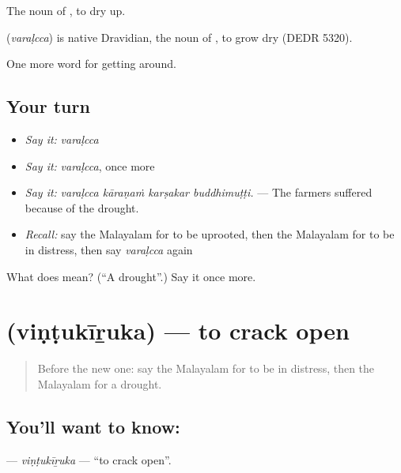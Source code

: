 The noun of , to dry up.

\begin{cousinweb}
\textbf{} (\emph{varaḷcca}) is native Dravidian, the noun of , to grow dry (DEDR 5320).
\end{cousinweb}

\begin{grammarlens}[title={What you've built}]
One more word for getting around.
\end{grammarlens}

\subsection*{Your turn}
\begin{itemize}
\raggedright
  \item \emph{Say it:} \emph{varaḷcca}
  \item \emph{Say it:} \emph{varaḷcca}, once more
  \item \emph{Say it:} \emph{varaḷcca kāraṇaṁ karṣakar buddhimuṭṭi.} — The farmers suffered because of the drought.
  \item \emph{Recall:} say the Malayalam for to be uprooted, then the Malayalam for to be in distress, then say \emph{varaḷcca} again
\end{itemize}

\begin{tcolorbox}[breakable,colback=teal!4,colframe=teal!35!black,title={Before you move on}]
What does  mean? (\textquotedblleft{}A drought\textquotedblright{}.) Say it once more.
\end{tcolorbox}
\section[\texorpdfstring{\ml{വിണ്ടുകീറുക} (viṇṭukīṟuka)}{വിണ്ടുകീറുക (viṇṭukīṟuka)}]{ (viṇṭukīṟuka) — to crack open}

\label{lesson:ML-C514-vintukiruka}



\begin{quote}
Before the new one: say the Malayalam for to be in distress, then the Malayalam for a drought.
\end{quote}

\subsection*{You'll want to know: }
\textbf{} — \emph{viṇṭukīṟuka} — \textquotedblleft{}to crack open\textquotedblright{}.

